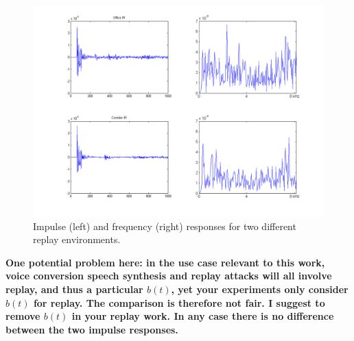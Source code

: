 \begin{figure}
	\centering
	\includegraphics[width=1\linewidth]{Figs/Room_IRs.png}
	\caption{Impulse (left) and frequency (right) responses for two different replay environments.}
	\label{fig::Room_IRs}
\end{figure}


{\bfseries One potential problem here: in the use case relevant to this work, voice conversion speech synthesis and replay attacks will all involve replay, and thus a particular $b(t)$, yet your experiments only consider $b(t)$ for replay.  The comparison is therefore not fair.  I suggest to remove $b(t)$ in your replay work.  In any case there is no difference between the two impulse responses.}